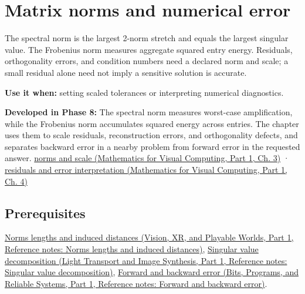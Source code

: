 \hypertarget{appendix-f8657bac66e5}{}\label{referencestart:appendix-f8657bac66e5}
\section{Matrix norms and numerical error}\label{appendix-f8657bac66e5-matrix-norms-and-numerical-error}

\hypertarget{appendix-f8657bac66e5-matrix-norms-and-numerical-error}{}

The spectral norm is the largest 2-norm stretch and equals the largest singular value. The Frobenius norm measures aggregate squared entry energy. Residuals, orthogonality errors, and condition numbers need a declared norm and scale; a small residual alone need not imply a sensitive solution is accurate.

\textbf{Use it when:} setting scaled tolerances or interpreting numerical diagnostics.

\textbf{Developed in Phase 8:} The spectral norm measures worst-case amplification, while the Frobenius norm accumulates squared energy across entries. The chapter uses them to scale residuals, reconstruction errors, and orthogonality defects, and separates backward error in a nearby problem from forward error in the requested answer. \href{../02-Mathematics-for-Visual-Computing-P01/main.pdf\#01-foundations-i-ch019-matrix-norms-put-scale-into-error-statements}{norms and scale (Mathematics for Visual Computing, Part 1, Ch. 3)} · \href{../02-Mathematics-for-Visual-Computing-P01/main.pdf\#01-foundations-i-ch020-residuals-distinguish-backward-accuracy-from-forward-certainty}{residuals and error interpretation (Mathematics for Visual Computing, Part 1, Ch. 4)}

\subsection{Prerequisites}\label{appendix-f8657bac66e5-prerequisites}

\hypertarget{appendix-f8657bac66e5-prerequisites}{}

\href{../07-Vision-XR-and-Playable-Worlds-P01/main.pdf\#appendix-49933872bb51}{Norms lengths and induced distances (Vision, XR, and Playable Worlds, Part 1, Reference notes: Norms lengths and induced distances)}, \href{../04-Light-Transport-and-Image-Synthesis-P01/main.pdf\#appendix-1fad5e7f36fa}{Singular value decomposition (Light Transport and Image Synthesis, Part 1, Reference notes: Singular value decomposition)}, \href{../01-Bits-Programs-and-Reliable-Systems-P01/main.pdf\#appendix-a7fbaf6d1b1c}{Forward and backward error (Bits, Programs, and Reliable Systems, Part 1, Reference notes: Forward and backward error)}.

